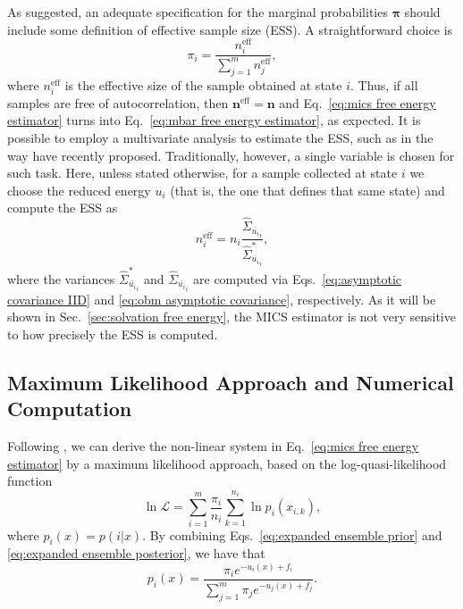 \documentclass[journal=jctcce,manuscript=article]{achemso}
\newcommand{\vt}[1]{\boldsymbol{\mathbf{#1}}}   %
\newcommand{\avg}[1]{\overline{#1}}             %
\begin{document}
As \citeauthor{Roy_2018} \cite{Roy_2018} suggested, an adequate specification for the marginal probabilities $\vt \pi$ should include some definition of effective sample size (ESS). A straightforward choice is
\begin{equation}
\label{eq:mics prior}
\pi_i = \frac{n^\text{eff}_i}{\sum_{j=1}^m n^\text{eff}_j},
\end{equation}
where $n^\text{eff}_i$ is the effective size of the sample obtained at state $i$. Thus, if all samples are free of autocorrelation, then ${\vt n}^\text{eff} = \vt n$ and Eq.~\eqref{eq:mics free energy estimator} turns into Eq.~\eqref{eq:mbar free energy estimator}, as expected. It is possible to employ a multivariate analysis to estimate the ESS, such as in the way \citeauthor{Vats_2015} \cite{Vats_2015, Vats_2018} have recently proposed. Traditionally, however, a single variable is chosen for such task. Here, unless stated otherwise, for a sample collected at state $i$ we choose the reduced energy $u_i$ (that is, the one that defines that same state) and compute the ESS as
\begin{equation*}
n^\text{eff}_i = n_i \frac{\hat{\Sigma}_{\avg{u_i}_i}}{\hat{\Sigma}^\ast_{\avg{u_i}_i}},
\end{equation*}
where the variances $\hat{\Sigma}_{\avg{u_i}_i}^\ast$ and $\hat{\Sigma}_{\avg{u_i}_i}$ are computed via Eqs.~\eqref{eq:asymptotic covariance IID} and \eqref{eq:obm asymptotic covariance}, respectively. As it will be shown in Sec.~\ref{sec:solvation free energy}, the MICS estimator is not very sensitive to how precisely the ESS is computed.

\subsection{Maximum Likelihood Approach and Numerical Computation}
\label{sec:maximum likelihood}

Following \citeauthor{Doss_2014} \cite{Doss_2014}, we can derive the non-linear system in Eq.~\eqref{eq:mics free energy estimator} by a maximum likelihood approach, based on the log-quasi-likelihood function \cite{Doss_2014, Tan_2015, Roy_2018}
\begin{equation}
\label{eq:mics log-quasi-likelihood}
\ln \mathcal L = \sum_{i=1}^m \frac{\pi_i}{n_i} \sum_{k=1}^{n_i} \ln p_i(x_{i,k}),
\end{equation}
where $p_i(x) = p(i|x)$. By combining Eqs.~\eqref{eq:expanded ensemble prior} and \eqref{eq:expanded ensemble posterior}, we have that
\begin{equation}
\label{eq:mixture posterior probability}
p_i(x) = \frac{\pi_i e^{-u_i(x) + f_i}}{\sum_{j=1}^m \pi_j e^{-u_j(x) + f_j}}.
\end{equation}
\end{document}
